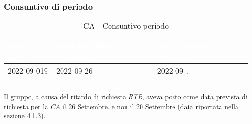             \subsubsection{Consuntivo di periodo} {
                \setlength{\freewidth}{\dimexpr\textwidth-30\tabcolsep}
                \renewcommand{\arraystretch}{1.0}
                \setlength{\aboverulesep}{0pt}
                \setlength{\belowrulesep}{0pt}
                \begin{longtable}{C{.4\freewidth} C{.4\freewidth} C{.4\freewidth}}
                \toprule
                \textcolor{white}{\textbf{Data inizio}}&
                \textcolor{white}{\textbf{Data previsione revisione}}&
                \textcolor{white}{\textbf{Data richiesta revisione}} \\
                \toprule
                \endhead
                    
                2022-09-019 & 2022-09-26 & 2022-09-.. \\
                \\
                \caption{CA - Consuntivo periodo}
                \end{longtable}
            
            Il gruppo, a causa del ritardo di richiesta \textit{RTB}, aveva posto come data prevista di richiesta per la \textit{CA} il 26 Settembre, e non il 20 Settembre (data riportata nella sezione 4.1.3).
    }
